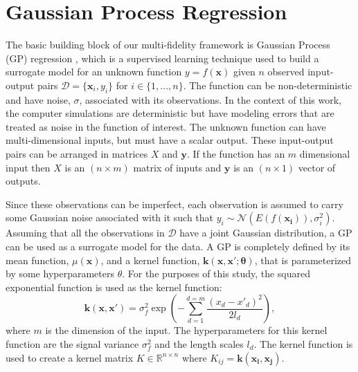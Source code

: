 \section{Gaussian Process Regression} \label{sec:gpr}
The basic building block of our multi-fidelity framework is Gaussian Process (GP) regression \cite{rasmussen_gaussian_2006}, which is a supervised learning technique used to build a surrogate model for an unknown function $y = f(\mathbf{x})$ given $n$ observed input-output pairs $\mathcal{D} = \{\mathbf{x}_i, y_i\}$ for $i \in\{1,...,n\}$. The function can be non-deterministic and have noise, $\sigma$, associated with its observations. In the context of this work, the computer simulations are deterministic but have modeling errors that are treated as noise in the function of interest. The unknown function can have multi-dimensional inputs, but must have a scalar output. These input-output pairs can be arranged in matrices $X$ and $\mathbf{y}$. If the function has an $m$ dimensional input then $X$ is an $\left (n \times m \right)$ matrix of inputs and $\mathbf{y}$ is an $\left (n \times 1 \right)$ vector of outputs.

Since these observations can be imperfect, each observation is assumed to carry some Gaussian noise associated with it such that $y_i \sim \mathcal{N}(E(f(\mathbf{x_i})),\sigma_i^2)$. Assuming that all the observations in $\mathcal{D}$ have a joint Gaussian distribution, a GP can be used as a surrogate model for the data. A GP is completely defined by its mean function, $ \mu(\mathbf{x}) $, and a kernel function, $\mathbf{k}(\mathbf{x,x';\theta})$, that is parameterized by some hyperparameters $\theta$. For the purposes of this study, the squared exponential function is used as the kernel function: 
\begin{equation}
    \mathbf{k}\left (\mathbf{x,x'} \right ) = \sigma_f^2 \exp \left ( -\sum_{d=1}^{d=m}\frac{\left ( x_d - x'_d \right )^2}{2l_d} \right ),
\end{equation}
where $m$ is the dimension of the input. The hyperparameters for this kernel function are the signal variance $\sigma_f^2$ and the length scales $l_d$. The kernel function is used to create a kernel matrix $K \in \mathbb{R} ^{ n \times n}$ where $K_{ij} = \mathbf{k \left( x_i, x_j \right )}$.

